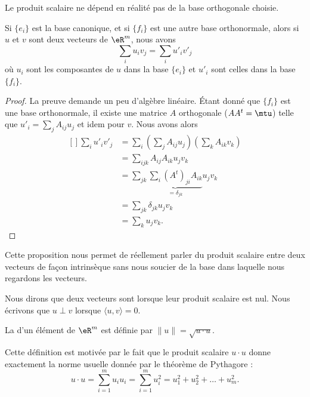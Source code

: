 Le produit scalaire ne dépend en réalité pas de la base orthogonale choisie. 

\begin{lemma}
	Si $\{ e_i \}$ est la base canonique, et si $\{ f_i \}$ est une autre base orthonormale, alors si $u$ et $v$ sont deux vecteurs de $\eR^m$, nous avons
	\begin{equation}
		\sum_i u_iv_j=\sum_iu'_iv'_j
	\end{equation}
	où $u_i$ sont les composantes de $u$ dans la base $\{ e_i \}$ et $u'_i$ sont celles dans la base $\{ f_i \}$.
\end{lemma}

\begin{proof}
	La preuve demande un peu d'algèbre linéaire. Étant donné que $\{ f_i \}$ est une base orthonormale, il existe une matrice $A$ orthogonale ($AA^t=\mtu$) telle que $u'_i=\sum_jA_{ij}u_j$ et idem pour $v$. Nous avons alors
	\begin{equation}
		\begin{aligned}[]
			\sum_iu'_iv'_j&=\sum_i\left( \sum_jA_{ij} u_j\right)\left( \sum_k A_{ik}v_k \right)\\
			&=\sum_{ijk}A_{ij}A_{ik}u_jv_k\\
			&=\sum_{jk}\underbrace{\sum_i(A^t)_{ji}A_{ik}}_{=\delta_{jk}}u_jv_k\\
			&=\sum_{jk}\delta_{jk}u_jv_k\\
			&=\sum_ku_jv_k.
		\end{aligned}
	\end{equation}	
\end{proof}

Cette proposition nous permet de réellement parler du produit scalaire entre deux vecteurs de façon intrinsèque sans nous soucier de la base dans laquelle nous regardons les vecteurs.

Nous dirons que deux vecteurs sont  lorsque leur produit scalaire est nul. Nous écrivons que $u\perp v$ lorsque $\langle u, v\rangle =0$.
\begin{definition}	\label{DefNormeEucleApp}
	La  d'un élément de $\eR^m$ est définie par $\| u \|=\sqrt{u\cdot u}$.
\end{definition}

Cette définition est motivée par le fait que le produit scalaire $u\cdot u$ donne exactement la norme usuelle donnée par le théorème de Pythagore :
\begin{equation}
	u\cdot u=\sum_{i=1}^mu_iu_i=\sum_{i=1}^m u_i^2=u_1^2+u_2^2+\ldots+u_m^2.
\end{equation}

